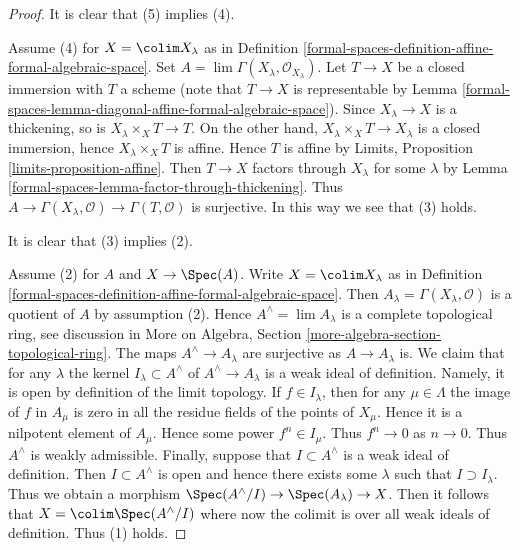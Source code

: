 \begin{proof}
It is clear that (5) implies (4).

\medskip\noindent
Assume (4) for $X = \colim X_\lambda$ as in
Definition \ref{formal-spaces-definition-affine-formal-algebraic-space}.
Set $A = \lim \Gamma(X_\lambda, \mathcal{O}_{X_\lambda})$.
Let $T \to X$ be a closed immersion with $T$ a scheme
(note that $T \to X$ is representable by
Lemma \ref{formal-spaces-lemma-diagonal-affine-formal-algebraic-space}).
Since $X_\lambda \to X$ is a thickening, so is
$X_\lambda \times_X T \to T$. On the other hand,
$X_\lambda \times_X T \to X_\lambda$ is a closed immersion,
hence $X_\lambda \times_X T$ is affine. Hence $T$ is affine
by Limits, Proposition \ref{limits-proposition-affine}.
Then $T \to X$ factors through $X_\lambda$ for some $\lambda$
by Lemma \ref{formal-spaces-lemma-factor-through-thickening}.
Thus $A \to \Gamma(X_\lambda, \mathcal{O}) \to \Gamma(T, \mathcal{O})$
is surjective. In this way we see that (3) holds.

\medskip\noindent
It is clear that (3) implies (2).

\medskip\noindent
Assume (2) for $A$ and $X \to \Spec(A)$. Write $X = \colim X_\lambda$
as in Definition \ref{formal-spaces-definition-affine-formal-algebraic-space}.
Then $A_\lambda = \Gamma(X_\lambda, \mathcal{O})$ is a quotient
of $A$ by assumption (2). Hence $A^\wedge = \lim A_\lambda$
is a complete topological ring, see discussion in
More on Algebra, Section \ref{more-algebra-section-topological-ring}.
The maps $A^\wedge \to A_\lambda$ are surjective as $A \to A_\lambda$ is.
We claim that for any $\lambda$ the kernel $I_\lambda \subset A^\wedge$ of
$A^\wedge \to A_\lambda$ is a weak ideal of definition.
Namely, it is open by definition of the limit topology.
If $f \in I_\lambda$, then for any $\mu \in \Lambda$
the image of $f$ in $A_\mu$ is zero in all the residue fields
of the points of $X_\mu$. Hence it is a nilpotent element
of $A_\mu$. Hence some power $f^n \in I_\mu$. Thus $f^n \to 0$
as $n \to 0$. Thus $A^\wedge$ is weakly admissible.
Finally, suppose that $I \subset A^\wedge$ is a weak ideal
of definition. Then $I \subset A^\wedge$ is open and hence there exists
some $\lambda$ such that $I \supset I_\lambda$. Thus we obtain a morphism
$\Spec(A^\wedge/I) \to \Spec(A_\lambda) \to X$.
Then it follows that $X = \colim \Spec(A^\wedge/I)$ where now
the colimit is over all weak ideals of definition.
Thus (1) holds.


\end{proof}
